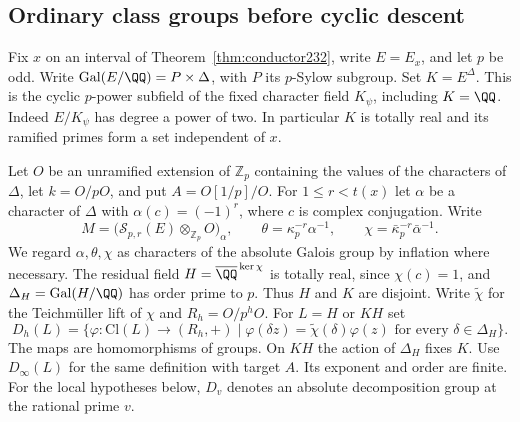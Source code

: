 \documentclass[a4paper,11pt]{article}
\theoremstyle{definition}
\theoremstyle{remark}
\newcommand{\ZZ}{\mathbb Z}\newcommand{\ord}{\operatorname{ord}}
\numberwithin{equation}{section}
\begin{document}
\subsection{Ordinary class groups before cyclic descent}
\label{sec:beforecyclic661}

Fix \(x\) on an interval of Theorem~\ref{thm:conductor232},
write \(E=E_x\), and let \(p\) be odd. Write
\(\operatorname{Gal}(E/\QQ)=P\times\Delta\), with \(P\) its
\(p\)-Sylow subgroup. Set \(K=E^\Delta\). This is the cyclic
\(p\)-power subfield of the fixed character field \(K_\psi\),
including \(K=\QQ\). Indeed \(E/K_\psi\) has degree a power
of two. In particular \(K\) is totally real and its ramified
primes form a set independent of \(x\).

Let \(O\) be an unramified extension of \(\ZZ_p\) containing
the values of the characters of \(\Delta\), let \(k=O/pO\),
and put \(A=O[1/p]/O\). For \(1\le r<t(x)\) let \(\alpha\)
be a character of \(\Delta\) with \(\alpha(c)=(-1)^r\), where
\(c\) is complex conjugation. Write
\[
 M=\big(\mathcal S_{p,r}(E)\otimes_{\ZZ_p}O\big)_\alpha,\qquad
 \theta=\kappa_p^{-r}\alpha^{-1},\qquad
 \chi=\bar\kappa_p^{-r}\bar\alpha^{-1}.
\]
We regard \(\alpha,\theta,\chi\) as characters of the absolute
Galois group by inflation where necessary. The residual field
\(H=\overline{\QQ}^{\,\ker\chi}\) is totally real, since
\(\chi(c)=1\), and \(\Delta_H=\operatorname{Gal}(H/\QQ)\)
has order prime to \(p\). Thus \(H\) and \(K\) are disjoint.
Write \(\widetilde\chi\) for the Teichm\"uller lift of \(\chi\)
and \(R_h=O/p^hO\). For \(L=H\) or \(KH\) set
\[
 D_h(L)=
 \{\varphi:\mathrm{Cl}(L)\longrightarrow (R_h,+)
      \mid \varphi(\delta z)=\widetilde\chi(\delta)\varphi(z)
                     \text{ for every }\delta\in\Delta_H\}.
\]
The maps are homomorphisms of groups. On \(KH\) the action of
\(\Delta_H\) fixes \(K\). Use \(D_\infty(L)\) for the same
definition with target \(A\). Its exponent and order are finite.
For the local hypotheses below, \(D_v\) denotes an absolute
decomposition group at the rational prime \(v\).
\end{document}
